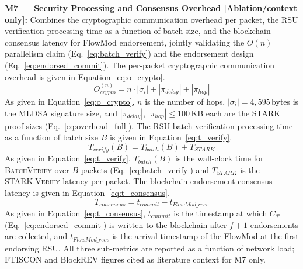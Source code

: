 \documentclass[12pt, a4paper]{report}
\begin{document}
{{%

\textbf{M7 — Security Processing and Consensus
Overhead [Ablation/context only]:}
Combines the cryptographic communication overhead
per packet, the RSU verification processing time
as a function of batch size, and the blockchain
consensus latency for FlowMod endorsement, jointly
validating the $O(n)$ parallelism claim
(Eq.~\ref{eq:batch_verify}) and the endorsement
design (Eq.~\ref{eq:endorsed_commit}).
The per-packet cryptographic communication overhead
is given in Equation~\eqref{eq:o_crypto}.
\begin{equation}
O_{crypto}^{(n)} =
n \cdot |\sigma_i|
+ |\pi_{delay}| + |\pi_{hop}|
\label{eq:o_crypto}
\end{equation}
As given in Equation~\eqref{eq:o_crypto},
$n$ is the number of hops, $|\sigma_i| =
4{,}595$\,bytes is the \ac{MLDSA} signature
size, and $|\pi_{delay}|$, $|\pi_{hop}|
\leq 100$\,KB each are the \ac{STARK} proof
sizes (Eq.~\ref{eq:overhead_full}).
The \ac{RSU} batch verification processing time
as a function of batch size $B$ is given in
Equation~\eqref{eq:t_verify}.
\begin{equation}
T_{verify}(B) =
T_{batch}(B) + T_{STARK}
\label{eq:t_verify}
\end{equation}
As given in Equation~\eqref{eq:t_verify},
$T_{batch}(B)$ is the wall-clock time for
\textsc{BatchVerify} over $B$ packets
(Eq.~\ref{eq:batch_verify}) and $T_{STARK}$
is the \textsc{STARK.Verify} latency per packet.
The blockchain endorsement consensus latency
is given in Equation~\eqref{eq:t_consensus}.
\begin{equation}
T_{consensus} =
t_{commit} - t_{FlowMod\_recv}
\label{eq:t_consensus}
\end{equation}
As given in Equation~\eqref{eq:t_consensus},
$t_{commit}$ is the timestamp at which
$C_\mathcal{P}$ (Eq.~\ref{eq:endorsed_commit})
is written to the blockchain after $f{+}1$
endorsements are collected, and
$t_{FlowMod\_recv}$ is the arrival timestamp
of the FlowMod at the first endorsing \ac{RSU}.
All three sub-metrics are reported as a function
of network load; \ac{FTISCON} and \ac{BlockREV}
figures cited as literature context for M7 only.



}}
\end{document}
